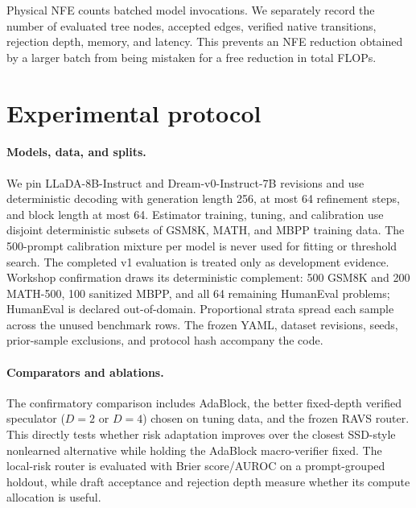 \documentclass{article}
\newcommand{\method}{\textsc{RAVS}\xspace}
\begin{document}
Physical NFE counts batched model invocations. We separately record the number of evaluated tree
nodes, accepted edges, verified native transitions, rejection depth, memory, and latency. This
prevents an NFE reduction obtained by a larger batch from being mistaken for a free reduction in
total FLOPs.

\section{Experimental protocol}

\paragraph{Models, data, and splits.}
We pin LLaDA-8B-Instruct and Dream-v0-Instruct-7B revisions and use deterministic decoding
with generation length 256, at most 64 refinement steps, and block length at most 64.
Estimator training, tuning, and calibration use disjoint deterministic subsets of GSM8K,
MATH, and MBPP training data. The 500-prompt calibration mixture per model is never used for
fitting or threshold search. The completed v1 evaluation is treated only as development
evidence. Workshop confirmation draws its deterministic complement: 500 GSM8K and 200 MATH-500,
100 sanitized MBPP, and all 64 remaining HumanEval problems; HumanEval is declared
out-of-domain. Proportional strata spread each sample across the unused benchmark rows. The
frozen YAML, dataset revisions, seeds, prior-sample exclusions, and protocol hash accompany
the code.

\paragraph{Comparators and ablations.}
The confirmatory comparison includes AdaBlock, the better fixed-depth verified speculator
($D=2$ or $D=4$) chosen on tuning data, and the frozen \method router. This directly tests whether
risk adaptation improves over the closest SSD-style nonlearned alternative while holding the
AdaBlock macro-verifier fixed. The local-risk router is evaluated with Brier score/AUROC on a
prompt-grouped holdout, while draft acceptance and rejection depth measure whether its compute
allocation is useful.
\end{document}
